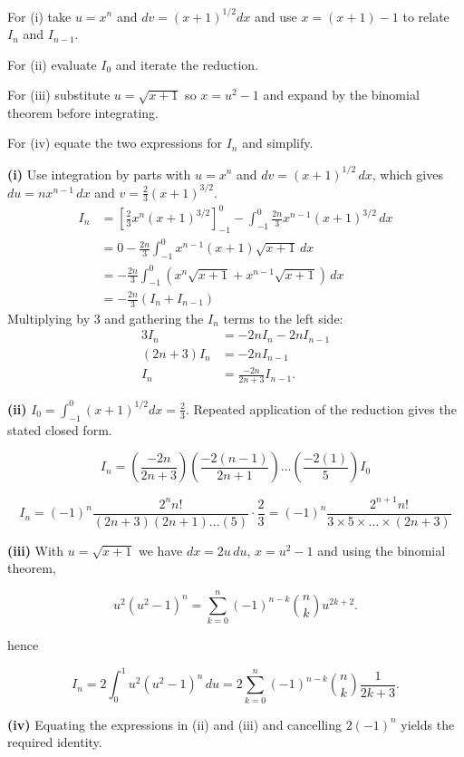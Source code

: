 \begin{hint}
For (i) take $u=x^n$ and $dv=(x+1)^{1/2}dx$ and use $x=(x+1)-1$ to relate $I_n$ and $I_{n-1}$. 

For (ii) evaluate $I_0$ and iterate the reduction. 

For (iii) substitute $u=\sqrt{x+1}$ so $x=u^2-1$ and expand by the binomial theorem before integrating. 

For (iv) equate the two expressions for $I_n$ and simplify.

\end{hint}

\begin{solution}
	\textbf{(i)} Use integration by parts with $u=x^n$ and $dv=(x+1)^{1/2}\,dx$, which gives $du = n x^{n-1}\,dx$ and $v=\frac{2}{3}(x+1)^{3/2}$.
\begin{align*}
I_n &= \left[ \frac{2}{3}x^n(x+1)^{3/2} \right]_{-1}^0 - \int_{-1}^0 \frac{2n}{3} x^{n-1}(x+1)^{3/2}\,dx \\
&= 0 - \frac{2n}{3} \int_{-1}^0 x^{n-1}(x+1)\sqrt{x+1}\,dx \\
&= -\frac{2n}{3} \int_{-1}^0 (x^n\sqrt{x+1} + x^{n-1}\sqrt{x+1})\,dx \\
&= -\frac{2n}{3} (I_n + I_{n-1})
\end{align*}
Multiplying by 3 and gathering the $I_n$ terms to the left side:
\begin{align*}
3I_n &= -2n I_n - 2n I_{n-1} \\
(2n+3)I_n &= -2n I_{n-1} \\
I_n &= \frac{-2n}{2n+3}I_{n-1}.
\end{align*}

	\textbf{(ii)} $I_0=\int_{-1}^0 (x+1)^{1/2}dx=\tfrac{2}{3}$. Repeated application of the reduction gives the stated closed form.
	
    \[ I_n = \left( \frac{-2n}{2n+3} \right) \left( \frac{-2(n-1)}{2n+1} \right) \dots \left( \frac{-2(1)}{5} \right) I_0
    \]

    \[ I_n = (-1)^n \frac{2^n n!}{(2n+3)(2n+1)\dots(5)} \cdot \frac{2}{3} = (-1)^n \frac{2^{n+1} n!}{3 \times 5 \times \dots \times (2n+3)}
    \]

    \textbf{(iii)} With $u=\sqrt{x+1}$ we have $dx=2u\,du$, $x=u^2-1$ 
    and using the binomial theorem,

    \[u^2(u^2-1)^n = \sum_{k=0}^n (-1)^{n-k}\binom{n}{k}u^{2k+2}.
    \]

    hence

    \[I_n=2\int_0^1 u^2(u^2-1)^n\,du=2\sum_{k=0}^n (-1)^{n-k}\binom{n}{k}\frac{1}{2k+3}.
    \]

	\textbf{(iv)} Equating the expressions in (ii) and (iii) and cancelling $2(-1)^n$ yields the required identity.
\end{solution}

